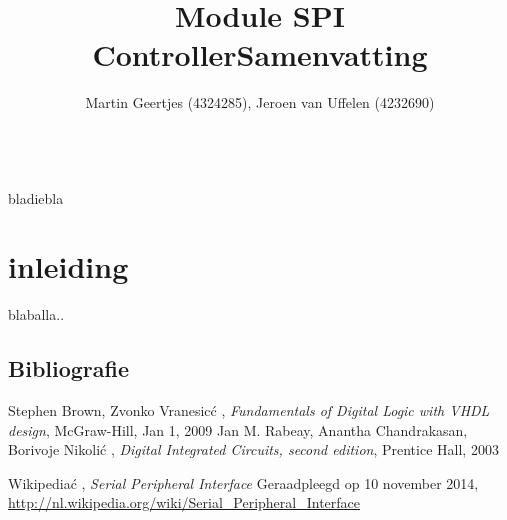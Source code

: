 \documentclass[a4paper, 10 pt]{report}
\title{Module SPI Controller}
\author{Martin Geertjes (4324285), Jeroen van Uffelen (4232690)}
\begin{document}
\maketitle
\newpage
\title{\textbf{Samenvatting}}\\
bladiebla

\newpage


\chapter{inleiding}
blaballa..\\

\newpage 




\newpage
\section{Bibliografie}
\begin{thebibliography}{10}
		Stephen Brown, Zvonko Vranesic\'c , 							\emph{Fundamentals of Digital Logic with VHDL design}, McGraw-Hill, Jan 1, 2009	
		Jan M. Rabeay, Anantha Chandrakasan, Borivoje Nikoli\'c , 							\emph{Digital Integrated Circuits, second edition}, Prentice Hall, 2003
	
	Wikipedia\'c , \emph{Serial Peripheral Interface} Geraadpleegd op 10 november 2014, \url{http://nl.wikipedia.org/wiki/Serial_Peripheral_Interface}

\end{thebibliography}




%
\end{document}
